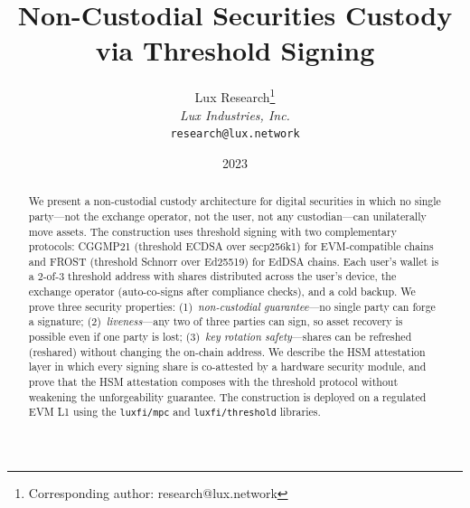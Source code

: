 \documentclass[11pt,a4paper]{article}
\title{Non-Custodial Securities Custody\\via Threshold Signing}
\author{
Lux Research\thanks{Corresponding author: research@lux.network}\\
\textit{Lux Industries, Inc.}\\
\texttt{research@lux.network}
}
\date{2023}
\begin{document}
\luxcoverpage

\begin{abstract}
We present a non-custodial custody architecture for digital securities
in which no single party---not the exchange operator, not the user, not
any custodian---can unilaterally move assets.  The construction uses
threshold signing with two complementary protocols: CGGMP21 (threshold
ECDSA over secp256k1) for EVM-compatible chains and FROST (threshold
Schnorr over Ed25519) for EdDSA chains.  Each user's wallet is a
$2$-of-$3$ threshold address with shares distributed across the user's
device, the exchange operator (auto-co-signs after compliance checks),
and a cold backup.  We prove three security properties:
(1)~\emph{non-custodial guarantee}---no single party can forge a
signature; (2)~\emph{liveness}---any two of three parties can sign,
so asset recovery is possible even if one party is lost;
(3)~\emph{key rotation safety}---shares can be refreshed
(reshared) without changing the on-chain address.
We describe the HSM attestation layer in which every signing share
is co-attested by a hardware security module, and prove that the
HSM attestation composes with the threshold protocol without
weakening the unforgeability guarantee.  The construction is deployed
on a regulated EVM L1 using the
\texttt{luxfi/mpc} and \texttt{luxfi/threshold} libraries.
\end{abstract}

\tableofcontents
\newpage











\end{document}
